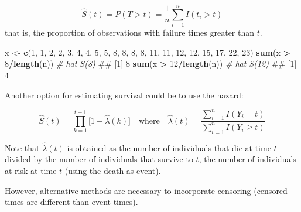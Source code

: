 \documentclass[]{book}
\makeatletter
\newenvironment{Shaded}{\begin{snugshade}}{\end{snugshade}}
\newcommand{\KeywordTok}[1]{\textcolor[rgb]{0.13,0.29,0.53}{\textbf{#1}}}
\newcommand{\DecValTok}[1]{\textcolor[rgb]{0.00,0.00,0.81}{#1}}
\newcommand{\StringTok}[1]{\textcolor[rgb]{0.31,0.60,0.02}{#1}}
\newcommand{\CommentTok}[1]{\textcolor[rgb]{0.56,0.35,0.01}{\textit{#1}}}
\newcommand{\OperatorTok}[1]{\textcolor[rgb]{0.81,0.36,0.00}{\textbf{#1}}}
\newcommand{\NormalTok}[1]{#1}
\newenvironment{kframe}{%
\medskip{}
\setlength{\fboxsep}{.8em}
 \def\at@end@of@kframe{}%
 \ifinner\ifhmode%
  \def\at@end@of@kframe{\end{minipage}}%
  \begin{minipage}{\columnwidth}%
 \fi\fi%
 \def\FrameCommand##1{\hskip\@totalleftmargin \hskip-\fboxsep
 \colorbox{shadecolor}{##1}\hskip-\fboxsep
     \hskip-\linewidth \hskip-\@totalleftmargin \hskip\columnwidth}%
 \MakeFramed {\advance\hsize-\width
   \@totalleftmargin\z@ \linewidth\hsize
   \@setminipage}}%
 {\par\unskip\endMakeFramed%
 \at@end@of@kframe}
\renewenvironment{Shaded}{\begin{kframe}}{\end{kframe}}
\theoremstyle{definition}
\theoremstyle{definition}
\theoremstyle{definition}
\theoremstyle{remark}
\makeatother
\begin{document}
\[
\hat S(t) = P(T \gt t) = \frac{1}{n} \sum_{i=1}^{n} I(t_i \gt t)
\] that is, the proportion of observations with failure times greater
than \(t\).

\begin{Shaded}
\begin{Highlighting}[]
\NormalTok{x <-}\StringTok{ }\KeywordTok{c}\NormalTok{(}\DecValTok{1}\NormalTok{, }\DecValTok{1}\NormalTok{, }\DecValTok{2}\NormalTok{, }\DecValTok{2}\NormalTok{, }\DecValTok{3}\NormalTok{, }\DecValTok{4}\NormalTok{, }\DecValTok{4}\NormalTok{, }\DecValTok{5}\NormalTok{, }\DecValTok{5}\NormalTok{, }\DecValTok{8}\NormalTok{, }\DecValTok{8}\NormalTok{, }\DecValTok{8}\NormalTok{, }\DecValTok{8}\NormalTok{, }\DecValTok{11}\NormalTok{, }\DecValTok{11}\NormalTok{, }\DecValTok{12}\NormalTok{, }\DecValTok{12}\NormalTok{, }\DecValTok{15}\NormalTok{, }\DecValTok{17}\NormalTok{, }\DecValTok{22}\NormalTok{, }\DecValTok{23}\NormalTok{)}
\KeywordTok{sum}\NormalTok{(x }\OperatorTok{>}\StringTok{ }\DecValTok{8}\OperatorTok{/}\KeywordTok{length}\NormalTok{(n)) }\CommentTok{# hat S(8) }
\NormalTok{## [1] 8}
\KeywordTok{sum}\NormalTok{(x }\OperatorTok{>}\StringTok{ }\DecValTok{12}\OperatorTok{/}\KeywordTok{length}\NormalTok{(n)) }\CommentTok{# hat S(12) }
\NormalTok{## [1] 4}
\end{Highlighting}
\end{Shaded}

Another option for estimating survival could be to use the hazard:

\[
\hat S(t) = \prod_{k = 1}^{t-1} \bigg [ 1- \hat \lambda(k)\bigg] \quad {\text{where}} \quad  \hat \lambda(t) = \frac{\sum_{i=1}^{n} I(Y_i = t)}{\sum_{i=1}^{n} I (Y_i \ge t)} 
\]

Note that \(\hat \lambda(t)\) is obtained as the number of individuals
that die at time \(t\) divided by the number of individuals that survive
to \(t\), the number of individuals at risk at time \(t\) (using the
death as event).

However, alternative methods are necessary to incorporate censoring
(censored times are different than event times).
\end{document}
